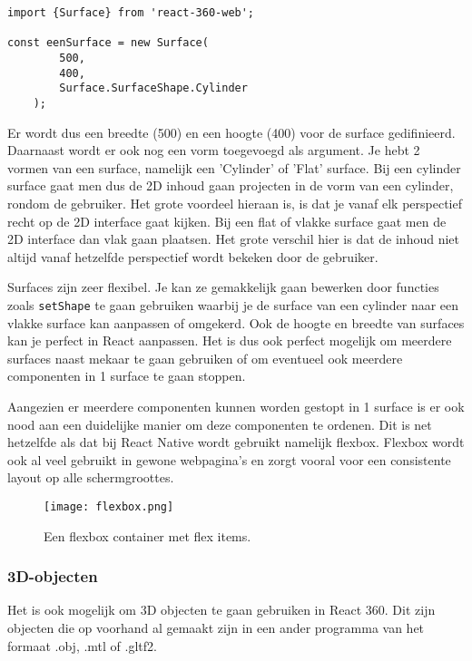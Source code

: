 \begin{lstlisting}[frame=single, caption=Voorbeeld van een surface]
import {Surface} from 'react-360-web';

const eenSurface = new Surface(
		500,
		400,
		Surface.SurfaceShape.Cylinder
	);
\end{lstlisting}

Er wordt dus een breedte (500) en een hoogte (400) voor de surface gedifinieerd. Daarnaast wordt er ook nog een vorm toegevoegd als argument. Je hebt 2 vormen van een surface, namelijk een 'Cylinder' of 'Flat' surface. Bij een cylinder surface gaat men dus de 2D inhoud gaan projecten in de vorm van een cylinder, rondom de gebruiker. Het grote voordeel hieraan is, is dat je vanaf elk perspectief recht op de 2D interface gaat kijken. Bij een flat of vlakke surface gaat men de 2D interface dan vlak gaan plaatsen. Het grote verschil hier is dat de inhoud niet altijd vanaf hetzelfde perspectief wordt bekeken door de gebruiker.

Surfaces zijn zeer flexibel. Je kan ze gemakkelijk gaan bewerken door functies zoals \lstinline[basicstyle=\ttfamily\color{red}]|setShape| te gaan gebruiken waarbij je de surface van een cylinder naar een vlakke surface kan aanpassen of omgekerd. Ook de hoogte en breedte van surfaces kan je perfect in React aanpassen. Het is dus ook perfect mogelijk om meerdere surfaces naast mekaar te gaan gebruiken of om eventueel ook meerdere componenten in 1 surface te gaan stoppen. 

Aangezien er meerdere componenten kunnen worden gestopt in 1 surface is er ook nood aan een duidelijke manier om deze componenten te ordenen. Dit is net hetzelfde als dat bij React Native wordt gebruikt namelijk flexbox. Flexbox wordt ook al veel gebruikt in gewone webpagina's en zorgt vooral voor een consistente layout op alle schermgroottes.

\begin{figure}[h]
	\centering
	\texttt{[image: flexbox.png]}
	\caption{Een flexbox container met flex items.}
	\label{fig:flexbox}
\end{figure}

\subsubsection{3D-objecten}
\label{ssubsec:3d-objecten}
Het is ook mogelijk om 3D objecten te gaan gebruiken in React 360. Dit zijn objecten die op voorhand al gemaakt zijn in een ander programma van het formaat .obj, .mtl of .gltf2.

